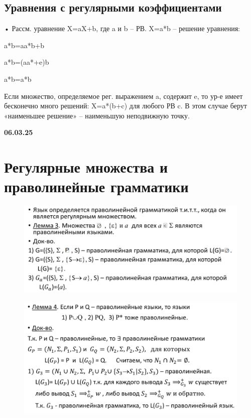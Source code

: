 \documentclass{article}
\begin{document}
\subsection{Уравнения с регулярными коэффициентами}

• Рассм. уравнение X=aX+b, где a и b – РВ.
X=a*b – решение уравнения:

a*b=aa*b+b

a*b=(aa*+e)b

a*b=a*b

Если множество, определяемое рег. выражением a, содержит e, то
ур-е имеет бесконечно много решений: X=a*(b+c) для любого РВ c.
В этом случае берут «наименьшее решение» – наименьшую
неподвижную точку.


\textbf{06.03.25}

\section{Регулярные множества и праволинейные грамматики}

\begin{figure}[H]
    \centering
    \includegraphics[width=1\linewidth]{Снимок экрана 2025-03-06 082915.png}
\end{figure}


\begin{figure}[H]
    \centering
    \includegraphics[width=1\linewidth]{Снимок экрана 2025-03-06 083016.png}
\end{figure}
\end{document}
